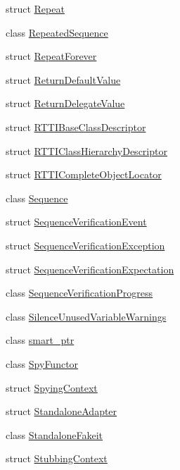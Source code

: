 \begin{DoxyCompactItemize}
struct \mbox{\hyperlink{structfakeit_1_1Repeat}{Repeat}}
\item 
class \mbox{\hyperlink{classfakeit_1_1RepeatedSequence}{Repeated\+Sequence}}
\item 
struct \mbox{\hyperlink{structfakeit_1_1RepeatForever}{Repeat\+Forever}}
\item 
struct \mbox{\hyperlink{structfakeit_1_1ReturnDefaultValue}{Return\+Default\+Value}}
\item 
struct \mbox{\hyperlink{structfakeit_1_1ReturnDelegateValue}{Return\+Delegate\+Value}}
\item 
struct \mbox{\hyperlink{structfakeit_1_1RTTIBaseClassDescriptor}{R\+T\+T\+I\+Base\+Class\+Descriptor}}
\item 
struct \mbox{\hyperlink{structfakeit_1_1RTTIClassHierarchyDescriptor}{R\+T\+T\+I\+Class\+Hierarchy\+Descriptor}}
\item 
struct \mbox{\hyperlink{structfakeit_1_1RTTICompleteObjectLocator}{R\+T\+T\+I\+Complete\+Object\+Locator}}
\item 
class \mbox{\hyperlink{classfakeit_1_1Sequence}{Sequence}}
\item 
struct \mbox{\hyperlink{structfakeit_1_1SequenceVerificationEvent}{Sequence\+Verification\+Event}}
\item 
struct \mbox{\hyperlink{structfakeit_1_1SequenceVerificationException}{Sequence\+Verification\+Exception}}
\item 
struct \mbox{\hyperlink{structfakeit_1_1SequenceVerificationExpectation}{Sequence\+Verification\+Expectation}}
\item 
class \mbox{\hyperlink{classfakeit_1_1SequenceVerificationProgress}{Sequence\+Verification\+Progress}}
\item 
class \mbox{\hyperlink{classfakeit_1_1SilenceUnusedVariableWarnings}{Silence\+Unused\+Variable\+Warnings}}
\item 
class \mbox{\hyperlink{classfakeit_1_1smart__ptr}{smart\+\_\+ptr}}
\item 
class \mbox{\hyperlink{classfakeit_1_1SpyFunctor}{Spy\+Functor}}
\item 
struct \mbox{\hyperlink{structfakeit_1_1SpyingContext}{Spying\+Context}}
\item 
struct \mbox{\hyperlink{structfakeit_1_1StandaloneAdapter}{Standalone\+Adapter}}
\item 
class \mbox{\hyperlink{classfakeit_1_1StandaloneFakeit}{Standalone\+Fakeit}}
\item 
struct \mbox{\hyperlink{structfakeit_1_1StubbingContext}{Stubbing\+Context}}

\end{DoxyCompactItemize}
